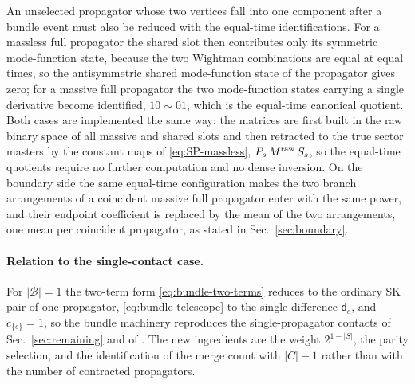 \documentclass[11pt,a4paper]{article}
\newcommand{\cB}{\mathcal B}
\begin{document}
An unselected propagator whose two vertices fall into one component after a bundle event must also be
reduced with the equal-time identifications. For a massless full propagator the shared slot then
contributes only its symmetric mode-function state,
because the two Wightman combinations are equal at equal times, so the antisymmetric shared
mode-function state of the
propagator gives zero; for a massive full propagator the two mode-function states carrying a single derivative become
identified, $10\sim01$, which is the equal-time canonical quotient. Both cases are implemented the
same way: the matrices are first built in the raw binary space of all massive and shared slots and
then retracted to the true sector masters by the constant maps of
\eqref{eq:SP-massless}, $P_s\,M^{\rm raw}\,S_s$, so the equal-time quotients require no further
computation and no dense inversion. On the boundary side the same equal-time configuration makes the two
branch arrangements of a coincident massive full propagator enter with the same power, and their endpoint
coefficient is replaced by the mean of the two arrangements, one mean per coincident propagator, as stated in
Sec.~\ref{sec:boundary}.

\paragraph{Relation to the single-contact case.}
For $|\cB|=1$ the two-term form \eqref{eq:bundle-two-terms} reduces to the ordinary SK pair of one
propagator, \eqref{eq:bundle-telescope} to the single difference $\mathsf d_e$, and $c_{\{e\}}=1$, so the
bundle machinery reproduces the single-propagator contacts of Sec.~\ref{sec:remaining} and of
\cite{Chen:2023iix}. The new ingredients are the
weight $2^{1-|S|}$, the parity selection, and the identification of the merge count with $|C|-1$
rather than with the number of contracted propagators.





\end{document}
